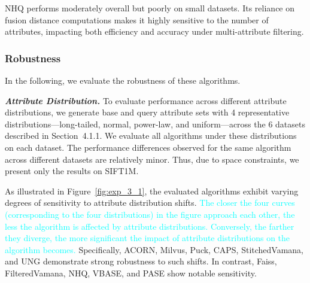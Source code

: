 \documentclass[sigconf, nonacm]{acmart}
\begin{document}
	
	NHQ performs moderately overall but poorly on small datasets. Its reliance on fusion distance computations makes it highly sensitive to the number of attributes, impacting both efficiency and accuracy under multi-attribute filtering.
	
	
	
	
	\subsubsection{Robustness}In the following, we evaluate the robustness of these algorithms.
	
	\textit{\textbf{Attribute Distribution.}} To evaluate performance across different attribute distributions, we generate base and query attribute sets with 4 representative distributions—long-tailed, normal, power-law, and uniform—across the 6 datasets described in Section~4.1.1. We evaluate all algorithms under these distributions on each dataset. The performance differences observed for the same algorithm across different datasets are relatively minor. Thus, due to space constraints, we present only the results on SIFT1M.
	
	As illustrated in Figure~\ref{fig:exp_3_1}, the evaluated algorithms exhibit varying degrees of sensitivity to attribute distribution shifts. \textcolor{cyan}{The closer the four curves (corresponding to the four distributions) in the figure approach each other, the less the algorithm is affected by attribute distributions. Conversely, the farther they diverge, the more significant the impact of attribute distributions on the algorithm becomes.} Specifically, ACORN, Milvus, Puck, CAPS, StitchedVamana, and UNG demonstrate strong robustness to such shifts. In contrast, Faiss, FilteredVamana, NHQ, VBASE, and PASE show notable sensitivity.
	
\end{document}
